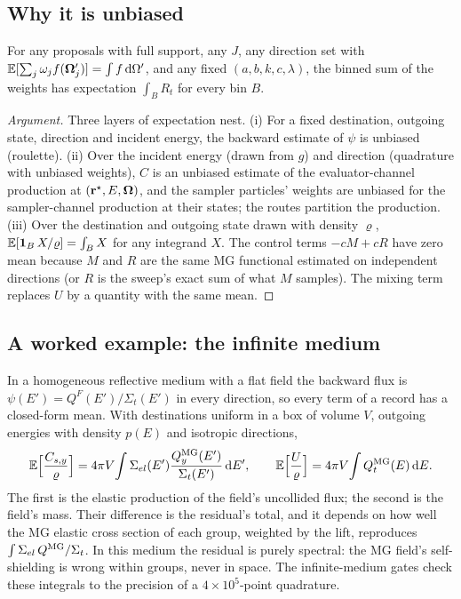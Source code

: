 \subsection{Why it is unbiased}

\begin{proposition}\label{prop:unbiased}
For any proposals with full support, any $J$, any direction set with $\mathbb E[\sum_j\omega_jf(\boldsymbol\Omega'_j)]=
\int f\,\mathrm d\Omega'$, and any fixed $(a,b,k,c,\lambda)$, the binned sum of the weights has expectation
$\int_B R_t$ for every bin $B$.
\end{proposition}
\begin{proof}[Argument]
Three layers of expectation nest. (i) For a fixed destination, outgoing state, direction and incident
energy, the backward estimate of $\psi$ is unbiased (roulette). (ii) Over the incident energy (drawn
from $g$) and direction (quadrature with unbiased weights), $C$ is an unbiased estimate of the
evaluator-channel production at $(\mathbf r^\star,E,\boldsymbol\Omega)$, and the sampler particles' weights are unbiased
for the sampler-channel production at their states; the routes partition the production. (iii) Over
the destination and outgoing state drawn with density $\varrho$, $\mathbb E[\mathbf 1_B\,X/\varrho]=\int_BX$
for any integrand $X$. The control terms $-cM+cR$ have zero mean because $M$ and $R$ are the same
MG functional estimated on independent directions (or $R$ is the sweep's exact sum of what $M$
samples). The mixing term replaces $U$ by a quantity with the same mean.
\end{proof}

\subsection{A worked example: the infinite medium}

In a homogeneous reflective medium with a flat field the backward flux is
$\psi(E')=Q^F(E')/\Sigma_t(E')$ in every direction, so every term of a record has a closed-form mean.
With destinations uniform in a box of volume $V$, outgoing energies with density $p(E)$ and isotropic
directions,
\begin{equation}
\mathbb E\Big[\frac{C_{s,y}}{\varrho}\Big]=4\pi V\!\int\Sigma_{el}(E')\frac{Q^{\mathrm{MG}}_y(E')}{\Sigma_t(E')}\,\mathrm d E',\qquad
\mathbb E\Big[\frac{U}{\varrho}\Big]=4\pi V\!\int Q^{\mathrm{MG}}_t(E)\,\mathrm d E .
\end{equation}
The first is the elastic production of the field's uncollided flux; the second is the field's mass.
Their difference is the residual's total, and it depends on how well the MG elastic cross section of
each group, weighted by the lift, reproduces $\int\Sigma_{el}\,Q^{\mathrm{MG}}/\Sigma_t$. In this medium the
residual is purely spectral: the MG field's self-shielding is wrong within groups, never in space.
The infinite-medium gates check these integrals to the precision of a $4\times10^5$-point quadrature.

